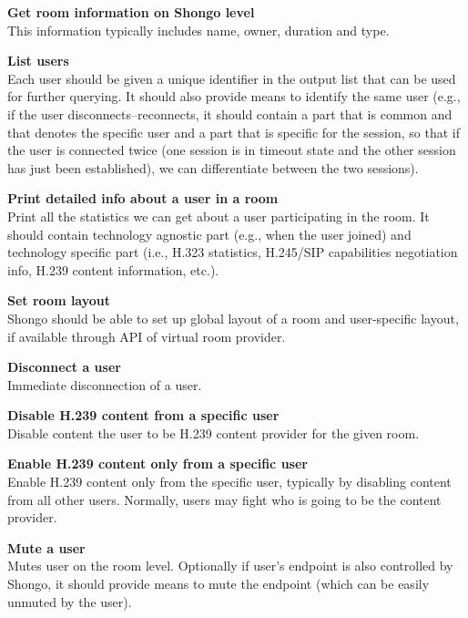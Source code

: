 \documentclass[a4paper]{report}
\makeatletter
\newcounter{UCcounter}
\newenvironment{UseCases}%
	{\begin{list}{\textbf{UC-\arabic{UCcounter}}}{\@nmbrlisttrue\def\@listctr{UCcounter}}}%
	{\end{list}}
\newcommand{\UClabel}[1]{\label{UC:#1}}
\newcommand{\UseCase}[2]{\item\UClabel{#2} \textbf{#1}\\}
\makeatother
\begin{document}
\begin{UseCases}

\UseCase{Get room information on Shongo level}{ops:room:shongo-options}

This information typically includes name, owner, duration and type.


\UseCase{List users}{ops:room:users-list}

Each user should be given a unique identifier in the output list that can be
used for further querying. It should also provide means to identify the same
user (e.g., if the user disconnects--reconnects, it should contain a part that
is common and that denotes the specific user and a part that is specific for
the session, so that if the user is connected twice (one session is in timeout
state and the other session has just been established), we can differentiate
between the two sessions).

\UseCase{Print detailed info about a user in a room}{ops:room:user-info}

Print all the statistics we can get about a user participating in the room. It
should contain technology agnostic part (e.g., when the user joined) and
technology specific part (i.e., H.323 statistics, H.245/SIP capabilities
negotiation info, H.239 content information, etc.).

\UseCase{Set room layout}{ops:room:layout}

Shongo should be able to set up global layout of a room and user-specific
layout, if available through API of virtual room provider.

\UseCase{Disconnect a user}{ops:room:user-disconnect}

Immediate disconnection of a user.

\UseCase{Disable H.239 content from a specific user}{ops:room:disable-user-content}

Disable content the user to be H.239 content provider for the given room. 

\UseCase{Enable H.239 content only from a specific user}{ops:room:specific-user-content}

Enable H.239 content only from the specific user, typically by disabling
content from all other users. Normally, users may fight who is going to be the
content provider.

\UseCase{Mute a user}{ops:room:user-mute} Mutes user on the room level.
Optionally if user's endpoint is also controlled by Shongo, it should provide
means to mute the endpoint (which can be easily unmuted by the user).


\end{UseCases}
\end{document}
